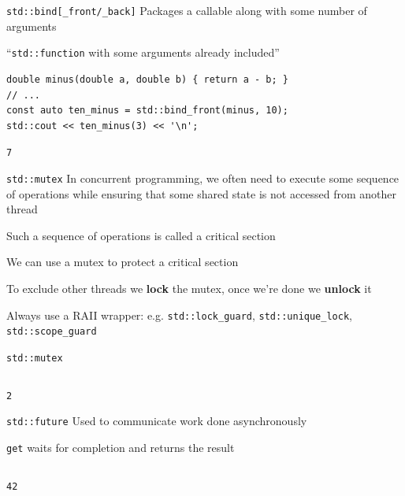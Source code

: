 \documentclass{beamer}
\begin{document}
\begin{frame}[fragile]{\texttt{std::bind[\_front/\_back]}}
Packages a callable along with some number of arguments

``\texttt{std::function} with some arguments already included''

\scriptsize
\vspace{.5cm}
\begin{verbatim}
double minus(double a, double b) { return a - b; }
// ...
const auto ten_minus = std::bind_front(minus, 10);
std::cout << ten_minus(3) << '\n';
\end{verbatim}

\vspace{.25cm}
\hrulefill

\texttt{7}
\end{frame}

\begin{frame}{\texttt{std::mutex}}
In concurrent programming, we often need to execute some sequence of operations while ensuring that some shared state is not accessed from another thread

Such a sequence of operations is called a critical section

We can use a mutex to protect a critical section

To exclude other threads we \textbf{lock} the mutex, once we're done we \textbf{unlock} it

Always use a RAII wrapper: e.g. \texttt{std::lock\_guard}, \texttt{std::unique\_lock}, \texttt{std::scope\_guard}
\end{frame}

\begin{frame}[fragile]{\texttt{std::mutex}}
\scriptsize
\inputminted{cpp}{../code/examples/example03.cpp}

\vspace{.25cm}
\hrulefill

\texttt{2}
\end{frame}

\begin{frame}{\texttt{std::future}}
Used to communicate work done asynchronously

\texttt{get} waits for completion and returns the result

\scriptsize
\vspace{.25cm}
\inputminted{cpp}{../code/examples/example04.cpp}

\vspace{.25cm}
\hrulefill

\texttt{42}
\end{frame}
\end{document}
